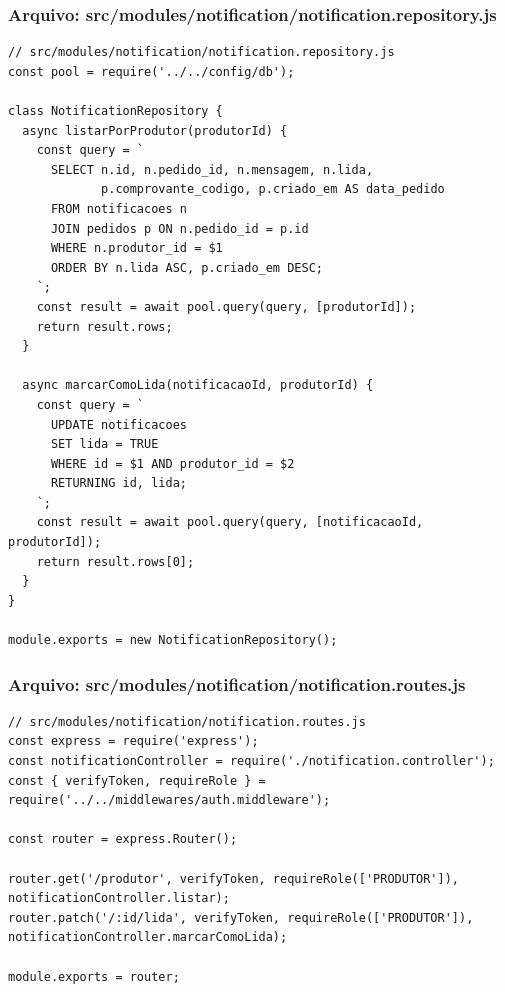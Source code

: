 \subsubsection*{Arquivo: src/modules/notification/notification.repository.js}
\begin{lstlisting}[caption={src/modules/notification/notification.repository.js}]
// src/modules/notification/notification.repository.js
const pool = require('../../config/db');

class NotificationRepository {
  async listarPorProdutor(produtorId) {
    const query = `
      SELECT n.id, n.pedido_id, n.mensagem, n.lida,
             p.comprovante_codigo, p.criado_em AS data_pedido
      FROM notificacoes n
      JOIN pedidos p ON n.pedido_id = p.id
      WHERE n.produtor_id = $1
      ORDER BY n.lida ASC, p.criado_em DESC;
    `;
    const result = await pool.query(query, [produtorId]);
    return result.rows;
  }

  async marcarComoLida(notificacaoId, produtorId) {
    const query = `
      UPDATE notificacoes 
      SET lida = TRUE 
      WHERE id = $1 AND produtor_id = $2 
      RETURNING id, lida;
    `;
    const result = await pool.query(query, [notificacaoId, produtorId]);
    return result.rows[0];
  }
}

module.exports = new NotificationRepository();\end{lstlisting}
\vspace{0.5cm}
\subsubsection*{Arquivo: src/modules/notification/notification.routes.js}
\begin{lstlisting}[caption={src/modules/notification/notification.routes.js}]
// src/modules/notification/notification.routes.js
const express = require('express');
const notificationController = require('./notification.controller');
const { verifyToken, requireRole } = require('../../middlewares/auth.middleware');

const router = express.Router();

router.get('/produtor', verifyToken, requireRole(['PRODUTOR']), notificationController.listar);
router.patch('/:id/lida', verifyToken, requireRole(['PRODUTOR']), notificationController.marcarComoLida);

module.exports = router;\end{lstlisting}
\vspace{0.5cm}
